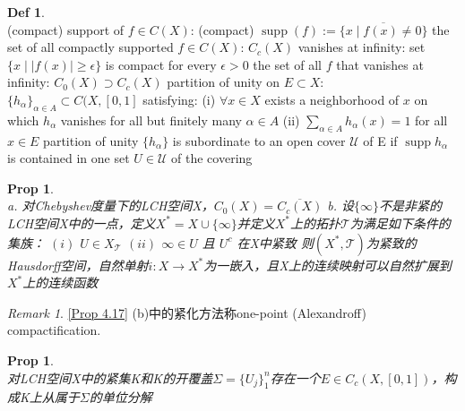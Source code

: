 \documentclass[hidelinks]{article}
\theoremstyle{definition}
\newtheorem*{defin}{Def}
\theoremstyle{plain}
\newtheorem{proposition}[theorem]{Prop}
\theoremstyle{remark}
\newtheorem*{remark}{Remark}
\DeclareMathOperator\supp{supp}
\begin{document}
\begin{defin}~\\
(compact) support of $f\in C(X)$: (compact) $\supp(f):=\overline{\{x\mid f(x)\neq 0\}}$ \newline
\indent the set of all compactly supported $f\in C(X)$: $C_c(X)$ \newline
vanishes at infinity: set $\{x\mid |f(x)|\geq \epsilon \}$ is compact for every $\epsilon >0$\newline
\indent the set of all $f$ that vanishes at infinity: $C_0(X)\supset C_c(X)$\newline
partition of unity on $E\subset X$: $\{h_\alpha\}_{\alpha \in A}\subset C(X,[0,1]$ satisfying:\newline
\indent (i) $\forall x\in X$ exists a neighborhood of $x$ on which $h_\alpha$ vanishes for all but finitely many $\alpha \in A$ \newline
\indent (ii) $\sum_{\alpha \in A}h_\alpha(x)=1$ for all $x\in E$ \newline
partition of unity $\{h_\alpha\}$ is subordinate to an open cover $\mathscr{U}$ of E if $\supp{h_\alpha}$ is contained in one set $U\in \mathscr{U}$ of the covering
\end{defin}

\begin{proposition}\label{Prop 4.17}~\\
a. 对Chebyshev度量下的LCH空间X，$C_0(X)=\overline{C_c(X)}$\newline
b. 设$\{\infty\}$不是非紧的LCH空间X中的一点，定义$X^*=X\cup \{\infty\}$并定义$X^*$上的拓扑$\mathscr{T}$为满足如下条件的集族：\newline
\indent $(i)$ $U\in X_\mathscr{T}$ \newline
\indent $(ii)$ $\infty \in U$ 且 $U^c$ 在X中紧致 \newline
则$(X^*,\mathscr{T})$为紧致的Hausdorff空间，自然单射$i:X\to X^*$为一嵌入，且X上的连续映射可以自然扩展到$X^*$上的连续函数
\end{proposition}

\begin{remark}
\autoref{Prop 4.17} (b)中的紧化方法称one-point (Alexandroff) compactification.
\end{remark}

\begin{proposition}~\\
对LCH空间X中的紧集K和K的开覆盖$\Sigma=\{U_j\}_{1}^{n}$存在一个$E\in C_c(X,[0,1])$，构成K上从属于$\Sigma$的单位分解
\end{proposition}
\end{document}
